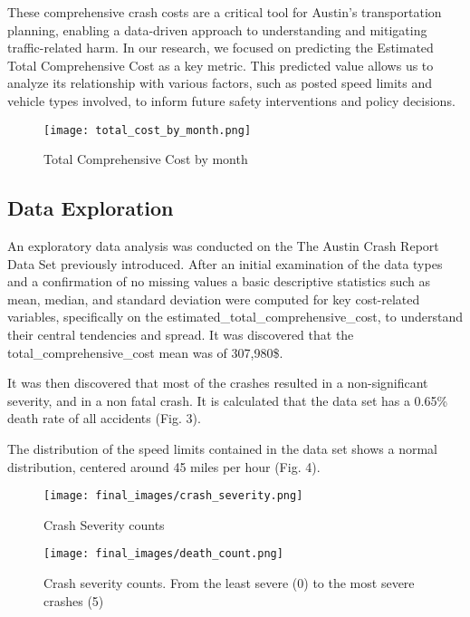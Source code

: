 \documentclass[conference]{IEEEtran}
\begin{document}
These comprehensive crash costs are a critical tool for Austin's transportation planning, enabling a data-driven approach to understanding and mitigating traffic-related harm. In our research, we focused on predicting the Estimated Total Comprehensive Cost as a key metric. This predicted value allows us to analyze its relationship with various factors, such as posted speed limits and vehicle types involved, to inform future safety interventions and policy decisions.

\begin{figure}
    \centering
    \texttt{[image: total\_cost\_by\_month.png]}
    \caption{Total Comprehensive Cost by month}
    \label{fig:enter-label}
\end{figure}

\subsection{Data Exploration}
An exploratory data analysis was conducted on the The Austin Crash Report Data Set previously introduced. After an initial examination of the data types and a confirmation of no missing values a basic descriptive statistics such as mean, median, and standard deviation were computed for key cost-related variables, specifically on the estimated\_total\_comprehensive\_cost, to understand their central tendencies and spread. It was discovered that the total\_comprehensive\_cost mean was of 307,980\$.

It was then discovered that most of the crashes resulted in a non-significant severity, and in a non fatal crash. It is calculated that the data set has a 0.65\% death rate of all accidents (Fig. 3). 

The distribution of the speed limits contained in the data set shows a normal distribution, centered around 45 miles per hour (Fig. 4).

\begin{figure}
    \centering
    \texttt{[image: final\_images/crash\_severity.png]}
    \caption{Crash Severity counts}
    \label{fig:enter-label}
\end{figure}

\begin{figure}
    \centering
    \texttt{[image: final\_images/death\_count.png]}
    \caption{Crash severity counts. From the least severe (0) to the most severe crashes (5)}
    \label{fig:enter-label}
\end{figure}
\end{document}
